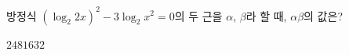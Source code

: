 방정식 $(\log_2 2x)^2-3\log_2 x^2=0$의 두 근을 $\alpha$, $\beta$라 할 때, $\alpha\beta$의 값은?
\begin{choices32}{$2$}{$4$}{$8$}{$16$}{$32$}\end{choices32}
